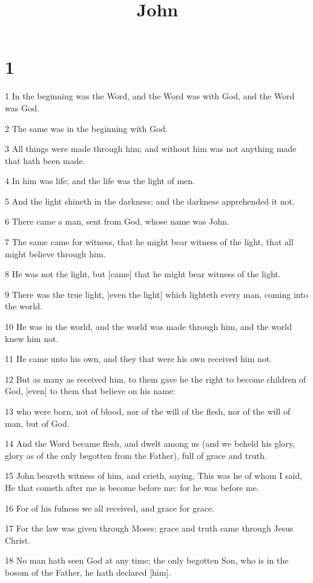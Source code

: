 

\title{John}

\chapter{1}

\par 1 In the beginning was the Word, and the Word was with God, and the Word was God.
\par 2 The same was in the beginning with God.
\par 3 All things were made through him; and without him was not anything made that hath been made.
\par 4 In him was life; and the life was the light of men.
\par 5 And the light shineth in the darkness; and the darkness apprehended it not.
\par 6 There came a man, sent from God, whose name was John.
\par 7 The same came for witness, that he might bear witness of the light, that all might believe through him.
\par 8 He was not the light, but [came] that he might bear witness of the light.
\par 9 There was the true light, [even the light] which lighteth every man, coming into the world.
\par 10 He was in the world, and the world was made through him, and the world knew him not.
\par 11 He came unto his own, and they that were his own received him not.
\par 12 But as many as received him, to them gave he the right to become children of God, [even] to them that believe on his name:
\par 13 who were born, not of blood, nor of the will of the flesh, nor of the will of man, but of God.
\par 14 And the Word became flesh, and dwelt among us (and we beheld his glory, glory as of the only begotten from the Father), full of grace and truth.
\par 15 John beareth witness of him, and crieth, saying, This was he of whom I said, He that cometh after me is become before me: for he was before me.
\par 16 For of his fulness we all received, and grace for grace.
\par 17 For the law was given through Moses; grace and truth came through Jesus Christ.
\par 18 No man hath seen God at any time; the only begotten Son, who is in the bosom of the Father, he hath declared [him].
